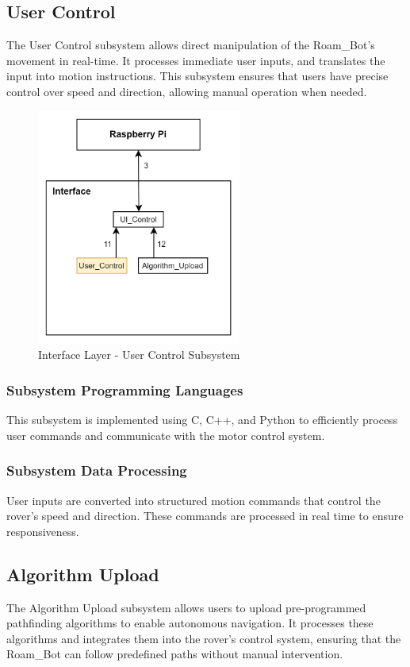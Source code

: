 \newpage

\subsection{User Control}
The User Control subsystem allows direct manipulation of the Roam\_Bot's movement in real-time. It processes immediate user inputs, and translates the input into motion instructions. This subsystem ensures that users have precise control over speed and direction, allowing manual operation when needed.

\begin{figure}[h!]
	\centering
 	\includegraphics[width=0.60\textwidth]{images/interface/2_user.jpg}
 \caption{Interface Layer - User Control Subsystem}
\end{figure}

\subsubsection{Subsystem Programming Languages}
This subsystem is implemented using C, C++, and Python to efficiently process user commands and communicate with the motor control system.

\subsubsection{Subsystem Data Processing}
User inputs are converted into structured motion commands that control the rover's speed and direction. These commands are processed in real time to ensure responsiveness.

\newpage

\subsection{Algorithm Upload}
The Algorithm Upload subsystem allows users to upload pre-programmed pathfinding algorithms to enable autonomous navigation. It processes these algorithms and integrates them into the rover's control system, ensuring that the Roam\_Bot can follow predefined paths without manual intervention.


